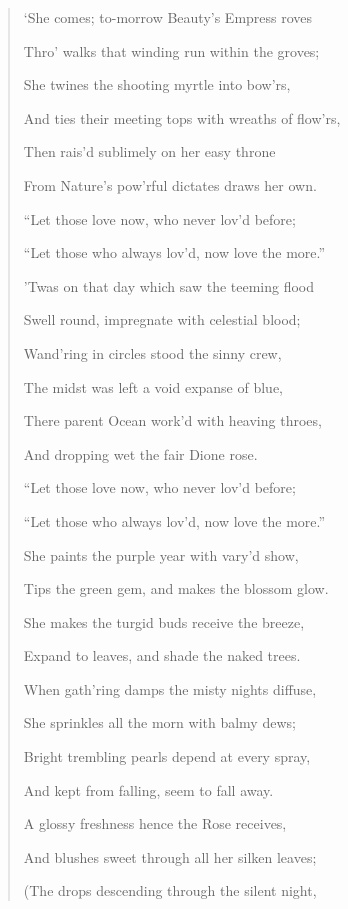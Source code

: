 \documentclass[a4paper, 11pt, oneside, polutonikogreek, english]{article}
\begin{document}
\begin{quotation}
`She comes; to-morrow Beauty's Empress roves

Thro' walks that winding run within the groves;

She twines the shooting myrtle into bow'rs,

And ties their meeting tops with wreaths of flow'rs,

Then rais'd sublimely on her easy throne

From Nature's pow'rful dictates draws her own.

\hspace*{15mm}``Let those love now, who never lov'd before;

``Let those who always lov'd, now love the more.''

\hspace*{15mm}'Twas on that day which saw the teeming flood

Swell round, impregnate with celestial blood;

Wand'ring in circles stood the sinny crew,

The midst was left a void expanse of blue,

There parent Ocean work'd with heaving throes,

And dropping wet the fair Dione rose.

\hspace*{15mm}``Let those love now, who never lov'd before;

``Let those who always lov'd, now love the more.''

\hspace*{15mm}She paints the purple year with vary'd show,

Tips the green gem, and makes the blossom glow.

She makes the turgid buds receive the breeze,

Expand to leaves, and shade the naked trees. 

When gath'ring damps the misty nights diffuse,

She sprinkles all the morn with balmy dews;

Bright trembling pearls depend at every spray,

And kept from falling, seem to fall away.

A glossy freshness hence the Rose receives,

And blushes sweet through all her silken leaves;

(The drops descending through the silent night,


\end{quotation}
\end{document}
